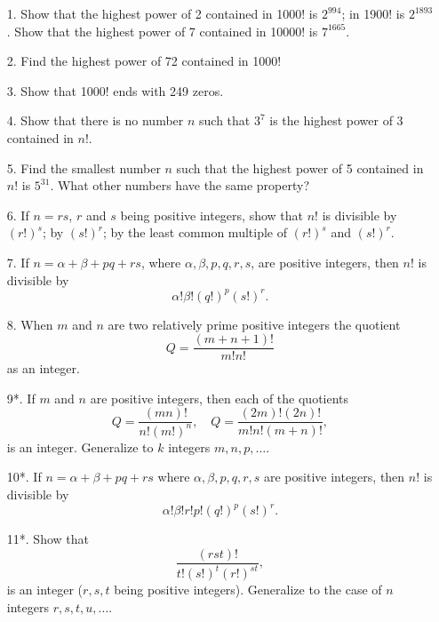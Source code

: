 \documentclass[oneside]{book}
\begin{document}
\small \begin{enumerate}
\item[1.] Show that the highest power of 2 contained in 1000! is
$2^{994}$; in 1900! is $2^{1893}$. Show that the highest power of 7
contained in 10000! is $7^{1665}$.

\item[2.] Find the highest power of 72 contained in 1000!

\item[3.] Show that 1000! ends with 249 zeros.

\item[4.] Show that there is no number $n$ such that $3^7$ is the
highest power of 3 contained in $n!$.

\item[5.] Find the smallest number $n$ such that the highest power
of 5 contained in $n!$ is $5^{31}$. What other numbers have the same
property?

\item[6.] If $n = rs$, $r$ and $s$ being positive integers, show that
$n!$ is divisible by $(r!)^s$; by $(s!)^r$; by the least common
multiple of $(r!)^s$ and $(s!)^r$.

\item[7.] If $n = \alpha + \beta + pq + rs$, where $\alpha, \beta, p,
q, r, s$, are positive integers, then $n!$ is divisible by
\begin{equation*}
\alpha ! \beta ! (q!)^p (s!)^r.
\end{equation*}

\item[8.] When $m$ and $n$ are two relatively prime positive integers
the quotient
\begin{equation*}
Q = \frac{(m + n + 1)!} {m! n!}
\end{equation*}
as an integer.

\item[9*.] If $m$ and $n$ are positive integers, then each of the
quotients
\begin{equation*}
Q = \frac{(mn)!} {n! (m!)^n},\quad
Q = \frac{(2m)! (2n)!} {m! n! (m+n)!},
\end{equation*}
is an integer. Generalize to $k$ integers $m, n, p, \ldots$.

\item[10*.] If $n = \alpha + \beta + pq + rs$ where $\alpha, \beta,
p, q, r, s$ are positive integers, then $n!$ is divisible by
\begin{equation*}
\alpha! \beta! r! p! (q!)^p (s!)^r.
\end{equation*}

\item[11*.] Show that
\begin{equation*}
\frac{(rst)!} {t! (s!)^t (r!)^{st}},
\end{equation*} is an integer ($r, s, t$ being positive integers).
Generalize to the case of $n$ integers $r, s, t, u, \ldots$.
\end{enumerate}\normalsize%
\end{document}
